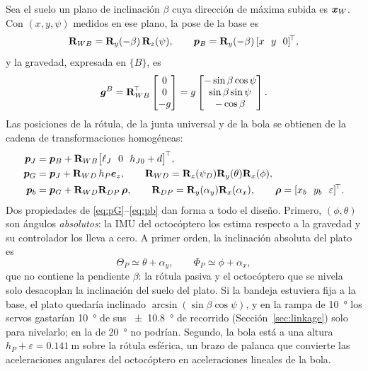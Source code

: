 Sea el suelo un plano de inclinación $\beta$ cuya dirección de máxima subida es $\bm{x}_W$. Con $(x,y,\psi)$ medidos en ese plano, la pose de la base es
\begin{equation}
  \mathbf{R}_{WB}=\mathbf{R}_y(-\beta)\,\mathbf{R}_z(\psi),\qquad \bm{p}_{B}=\mathbf{R}_y(-\beta)\,[x\ \ y\ \ 0]^{\!\top} ,
  \label{eq:slope}
\end{equation}
y la gravedad, expresada en $\{B\}$, es
\begin{equation}
  \bm{g}^{B}=\mathbf{R}_{WB}^{\!\top}\begin{bmatrix}0\\0\\-g\end{bmatrix}=g\begin{bmatrix}-\sin\beta\cos\psi\\ \sin\beta\sin\psi\\ -\cos\beta\end{bmatrix}.
  \label{eq:gB}
\end{equation}
Las posiciones de la rótula, de la junta universal y de la bola se obtienen de la cadena de transformaciones homogéneas:
\begin{align}
  \vect p_J&=\vect p_B+\Rot_{WB}\big[\ell_J\ \ 0\ \ h_{J0}+d\big]\T, \label{eq:pJ}\\
  \vect p_G&=\vect p_J+\Rot_{WD}\,h_P\ez,\qquad \Rot_{WD}=\Rot_z(\psi_D)\Rot_y(\theta)\Rot_x(\phi), \label{eq:pG}\\
  \vect p_b&=\vect p_G+\Rot_{WD}\Rot_{DP}\,\vect\rho,\qquad \Rot_{DP}=\Rot_y(\alpha_y)\Rot_x(\alpha_x),\qquad \vect\rho=[x_b\ \ y_b\ \ \varepsilon]\T . \label{eq:pb}
\end{align}
Dos propiedades de \eqref{eq:pG}--\eqref{eq:pb} dan forma a todo el diseño. Primero, $(\phi,\theta)$ son ángulos \emph{absolutos}: la IMU del octocóptero los estima respecto a la gravedad y su controlador los lleva a cero. A primer orden, la inclinación absoluta del plato es
\begin{equation}
  \Theta_P\simeq\theta+\alpha_y,\qquad \Phi_P\simeq\phi+\alpha_x ,
  \label{eq:tilt}
\end{equation}
que no contiene la pendiente $\beta$: la rótula pasiva y el octocóptero que se nivela solo desacoplan la inclinación del suelo del plato. Si la bandeja estuviera fija a la base, el plato quedaría inclinado $\arcsin(\sin\beta\cos\psi)$, y en la rampa de \SI{10}{\degree} los servos gastarían \SI{10}{\degree} de sus \SI{\pm10.8}{\degree} de recorrido (Sección~\ref{sec:linkage}) solo para nivelarlo; en la de \SI{20}{\degree} no podrían. Segundo, la bola está a una altura $h_P+\varepsilon=\SI{0.141}{\metre}$ sobre la rótula esférica, un brazo de palanca que convierte las aceleraciones angulares del octocóptero en aceleraciones lineales de la bola.

